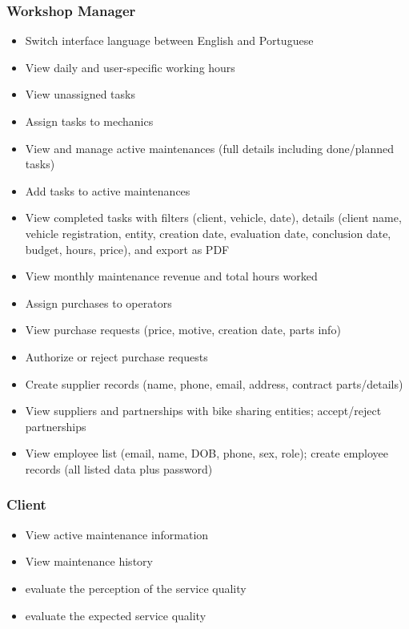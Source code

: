 \subsubsection{Workshop Manager}
\begin{itemize}
    \item Switch interface language between English and Portuguese
    \item View daily and user-specific working hours
    \item View unassigned tasks
    \item Assign tasks to mechanics
    \item View and manage active maintenances (full details including done/planned tasks)
    \item Add tasks to active maintenances
    \item View completed tasks with filters (client, vehicle, date), details (client name, vehicle registration, entity, creation date, evaluation date, conclusion date, budget, hours, price), and export as PDF
    \item View monthly maintenance revenue and total hours worked
    \item Assign purchases to operators
    \item View purchase requests (price, motive, creation date, parts info)
    \item Authorize or reject purchase requests
    \item Create supplier records (name, phone, email, address, contract parts/details)
    \item View suppliers and partnerships with bike sharing entities; accept/reject partnerships
    \item View employee list (email, name, DOB, phone, sex, role); create employee records (all listed data plus password)
\end{itemize}


\subsubsection{Client}
\begin{itemize}
    \item View active maintenance information
    \item View maintenance history
    \item evaluate the perception of the service quality 
    \item evaluate the expected service quality 
\end{itemize}


